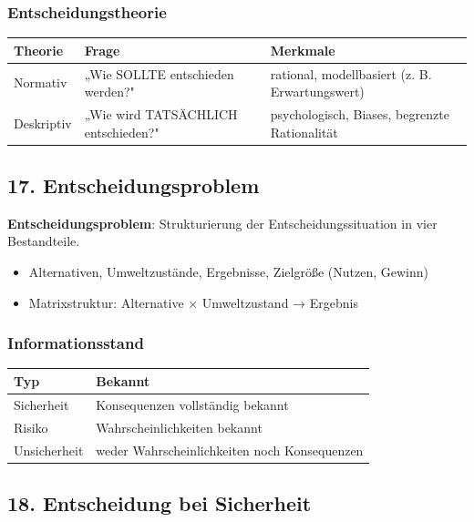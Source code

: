 \documentclass[11pt, a4paper]{article}
\begin{document}
\subsubsection{Entscheidungstheorie}


{\small
\begin{tabularx}{\linewidth}{XXX}
\hline
\rowcolor{tableheadbg}
{\color{white}\textbf{Theorie}} & {\color{white}\textbf{Frage}} & {\color{white}\textbf{Merkmale}} \\[2pt]
\hline
\endhead
\hline
\endfoot
Normativ & „Wie SOLLTE entschieden werden?" & rational, modellbasiert (z. B. Erwartungswert) \\
Deskriptiv & „Wie wird TATSÄCHLICH entschieden?" & psychologisch, Biases, begrenzte Rationalität \\
\end{tabularx}
}



\subsection{17. Entscheidungsproblem}

\textbf{Entscheidungsproblem}: Strukturierung der Entscheidungssituation in vier Bestandteile.

\begin{itemize}
  \item Alternativen, Umweltzustände, Ergebnisse, Zielgröße (Nutzen, Gewinn)
  \item Matrixstruktur: Alternative × Umweltzustand → Ergebnis
\end{itemize}


\subsubsection{Informationsstand}


{\small
\begin{tabularx}{\linewidth}{XX}
\hline
\rowcolor{tableheadbg}
{\color{white}\textbf{Typ}} & {\color{white}\textbf{Bekannt}} \\[2pt]
\hline
\endhead
\hline
\endfoot
Sicherheit & Konsequenzen vollständig bekannt \\
Risiko & Wahrscheinlichkeiten bekannt \\
Unsicherheit & weder Wahrscheinlichkeiten noch Konsequenzen \\
\end{tabularx}
}



\subsection{18. Entscheidung bei Sicherheit}
\end{document}
